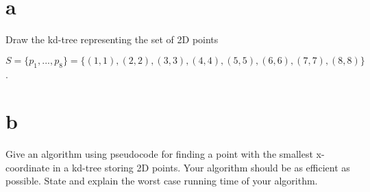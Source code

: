 \documentclass[12pt]{article}
\begin{document}
	\begin{enumerate}
		\part{a}  Draw the kd-tree representing the set of 2D points 
		
		$S = \{ p_1,...,p_8 \} = \{(1,1), (2,2), (3,3), (4,4),(5,5),(6,6), (7,7), (8,8)  \}$.
		
		\part{b} Give an algorithm using pseudocode for finding a point with the smallest x-coordinate in a kd-tree storing 2D points. Your algorithm should be as efficient as possible.  State and explain the worst case running time of your algorithm. 
		
	\end{enumerate}
	
	
	
\end{document}
